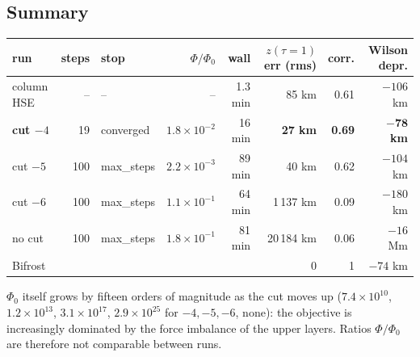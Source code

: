 \subsection{Summary}
\begin{center}\small
\begin{tabular}{lrlrrrrr}
\toprule
run & steps & stop & $\Phi/\Phi_0$ & wall & $z(\tau{=}1)$ err (rms) & corr. & Wilson depr.\\
\midrule
column HSE & -- & -- & -- & 1.3 min & 85 km & 0.61 & $-106$ km\\
\textbf{cut $-4$} & 19 & converged & $1.8\times10^{-2}$ & 16 min & \textbf{27 km} & \textbf{0.69} & $\mathbf{-78}$ \textbf{km}\\
cut $-5$ & 100 & max\_steps & $2.2\times10^{-3}$ & 89 min & 40 km & 0.62 & $-104$ km\\
cut $-6$ & 100 & max\_steps & $1.1\times10^{-1}$ & 64 min & 1\,137 km & 0.09 & $-180$ km\\
no cut & 100 & max\_steps & $1.8\times10^{-1}$ & 81 min & 20\,184 km & 0.06 & $-16$ Mm\\
Bifrost & & & & & 0 & 1 & $-74$ km\\
\bottomrule
\end{tabular}
\end{center}
$\Phi_0$ itself grows by fifteen orders of magnitude as the cut moves up ($7.4\times10^{10}$, $1.2\times10^{13}$,
$3.1\times10^{17}$, $2.9\times10^{25}$ for $-4,-5,-6$, none): the objective is increasingly dominated by the force
imbalance of the upper layers. Ratios $\Phi/\Phi_0$ are therefore not comparable between runs.

